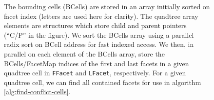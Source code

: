 \documentclass[final,3p,times,twocolumn]{elsarticle}
\begin{document}
\begin{figure}
  \centering
  \caption{
    \protect{} The bounding cells (BCells) are stored in an array initially sorted on facet index (letters are used here for clarity). The quadtree array elements are structures which store child and parent pointers (``C/P'' in the figure).
    \protect{} We sort the BCells array using a parallel radix sort on BCell address for fast indexed access. We then, in parallel on each element of the BCells array, store the BCells/FacetMap indices of the first and last facets in a given quadtree cell in \texttt{FFacet} and \texttt{LFacet}, respectively.
\protect{} For a given quadtree cell, we can find all contained facets for use in algorithm \ref{alg:find-conflict-cells}.
  }
  \label{fig:data-structures}
\end{figure}

\end{document}
